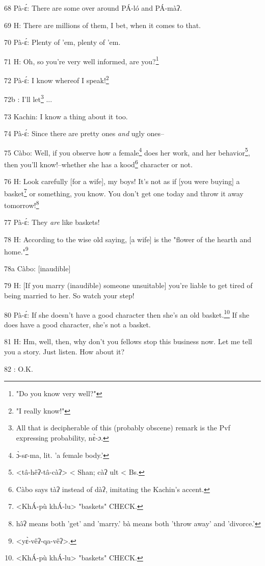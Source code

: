 68 Pà-ɛ́: There are some over around PÁ-ló and PÁ-màʔ.

69 H: There are millions of them, I bet, when it comes to that.

70 Pà-ɛ́: Plenty of 'em, plenty of 'em.

71 H: Oh, so you're very well informed, are you?\footnote{"Do you know very well?"}

72 Pà-ɛ́: I know whereof I speak!\footnote{"I really know!"}

72b       : I'll let\footnote{All that is decipherable of this (probably obscene) remark is the Pvf expressing probability, nɛ̀-\emph{ɔ}.} ...

73 Kachin: I know a thing about it too.

74 Pà-ɛ́: Since there are pretty ones \textit{and} ugly ones--

75 Càbo: Well, if you observe how a female\footnote{ɔ̀-s\emph{ɛ}-ma, lit. 'a female body.'} does her work, and her behavior\footnote{<tâ-hêʔ-tâ-càʔ> < Shan; càʔ ult < Bs.},
then you'll know!--whether she has a kood\footnote{Càbo says tàʔ instead of dàʔ, imitating the Kachin's accent.} character or not.

76 H: Look carefully [for a wife], my boys! It's not as if [you were buying] a
basket\footnote{<KhÁ-pù khÁ-lu> "baskets" CHECK.} or something, you know. You don't get one today and throw it away tomorrow!\footnote{hə̂ʔ means both 'get' and 'marry.' bà means both 'throw away' and 'divorce.'}

77 Pà-ɛ́: They \textit{are} like baskets!

78 H: According to the wise old saying, [a wife] is the "flower of the
hearth and home."\footnote{<yɛ̀-vêʔ-qa-vêʔ>.}

78a Càbo: [inaudible]

79 H: [If you marry (inaudible) someone unsuitable] you're liable to get tired
of being married to her. So watch your step!

80 Pà-ɛ́: If she doesn't have a good character then she's an old basket.\footnote{<KhÁ-pù khÁ-lu> "baskets" CHECK.}
If she does have a good character, she's not a basket.

81 H: Hm, well, then, why don't you fellows stop this business now. Let me tell
you a story. Just listen. How about it?

82    : O.K.

